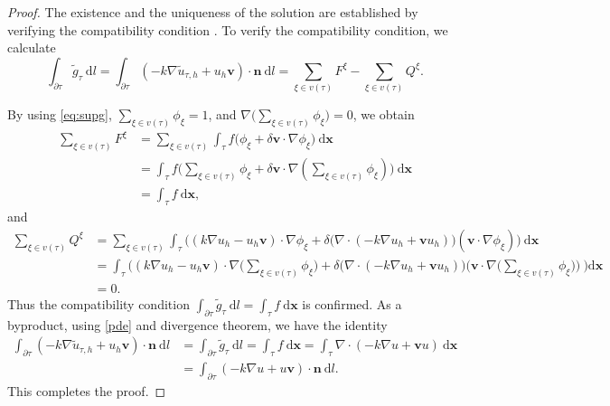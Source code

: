\documentclass[times]{nlaauth}
\numberwithin{equation}{section}
\begin{document}
\begin{proof}
The existence and the uniqueness of the solution are established by verifying the compatibility condition \cite{evans2010partial}. To verify the compatibility condition, we calculate 
\begin{equation*}
\int_{\partial\tau} \widetilde g_\tau \ \text{d} l = \int_{\partial \tau} ( - k \nabla \widetilde u_{\tau, h}  +  u_h \boldsymbol{v} ) \cdot \boldsymbol{n}  \ \text{d} l 
= \sum_{\xi\in v(\tau)} F^\xi - \sum_{\xi\in v(\tau)} Q^\xi.
\end{equation*}

\noindent
By using \eqref{eq:supg}, $\sum_{\xi\in v(\tau)} \phi_\xi = 1$, and $\nabla \big( \sum_{\xi\in v(\tau)} \phi_\xi \big) = 0$, we obtain
\begin{equation*}
\begin{aligned}
\sum_{\xi\in v(\tau)} F^\xi & = \sum_{\xi\in v(\tau)} \int_\tau f \big(  \phi_\xi + \delta \boldsymbol{v}  \cdot \nabla \phi_\xi  \big) \ \text{d} \boldsymbol{x} \\
& = \int_\tau f \Big( \sum_{\xi\in v(\tau)} \phi_\xi + \delta \boldsymbol{v}  \cdot \nabla ( \sum_{\xi\in v(\tau)} \phi_\xi )  \Big) \ \text{d} \boldsymbol{x} \\
& = \int_\tau f \ \text{d} \boldsymbol{x},
\end{aligned} 
\end{equation*}
and
\begin{equation*}
\begin{aligned}
\sum_{\xi\in v(\tau)} Q^\xi & = \sum_{\xi\in v(\tau)} \int_\tau \Big( ( k \nabla u_h - u_h \boldsymbol{v} ) \cdot \nabla \phi_\xi + \delta  \big(  \nabla \cdot ( -k\nabla u_h + \boldsymbol{v} u_h ) \big)  ( \boldsymbol{v}  \cdot \nabla \phi_\xi) \Big) \ \text{d} \boldsymbol{x} \\
& = \int_\tau \Big( ( k \nabla u_h - u_h \boldsymbol{v} ) \cdot \nabla \big( \sum_{\xi\in v(\tau)} \phi_\xi \big) + \delta  \big(  \nabla \cdot ( -k\nabla u_h + \boldsymbol{v} u_h ) \big)  \big( \boldsymbol{v}  \cdot \nabla \big( \sum_{\xi\in v(\tau)} \phi_\xi \big) \big) \ 
\Big)
\text{d} \boldsymbol{x} \\
& = 0.
\end{aligned} 
\end{equation*}
Thus the compatibility condition $\int_{\partial\tau} \widetilde g_\tau \ \text{d} l = \int_\tau f \ \text{d} \boldsymbol{x}$ is confirmed. As a byproduct, using \eqref{pde} and divergence theorem, we have the identity
\begin{equation*}
\begin{aligned}
\int_{\partial \tau} ( - k \nabla \widetilde u_{\tau, h}  +  u_h \boldsymbol{v} ) \cdot \boldsymbol{n} \ \text{d} l & = \int_{\partial\tau} \widetilde g_\tau \ \text{d} l = \int_\tau f \ \text{d} \boldsymbol{x}  = \int_\tau \nabla \cdot ( -k\nabla u + \boldsymbol{v} u )  \ \text{d} \boldsymbol{x} \\
& = \int_{\partial\tau } ( -k \nabla u + u \boldsymbol{v} ) \cdot \boldsymbol{n}  \ \text{d} l.
\end{aligned} 
\end{equation*}
This completes the proof.
\end{proof}
\end{document}
